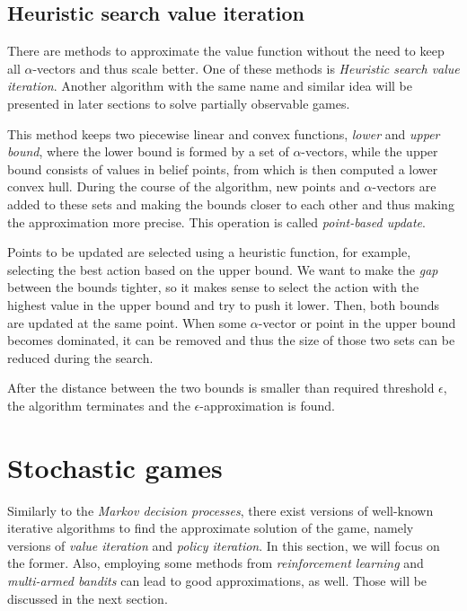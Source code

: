 \documentclass[../main.tex]{subfiles}
\begin{document}
\subsection{Heuristic search value iteration}\label{standard:pomdp:hsvi}
There are methods to approximate the value function without the need to keep all $\alpha$-vectors and thus scale better.
One of these methods is \textit{Heuristic search value iteration}\cite{hsvi}.
Another algorithm with the same name and similar idea will be presented in later sections to solve partially observable games.

This method keeps two piecewise linear and convex functions, \textit{lower} and \textit{upper bound}, where the lower bound is formed by a set of $\alpha$-vectors, while the upper bound consists of values in belief points, from which is then computed a lower convex hull.
During the course of the algorithm, new points and $\alpha$-vectors are added to these sets and making the bounds closer to each other and thus making the approximation more precise.
This operation is called \textit{point-based update}.

Points to be updated are selected using a heuristic function, for example, selecting the best action based on the upper bound.
We want to make the \textit{gap} between the bounds tighter, so it makes sense to select the action with the highest value in the upper bound and try to push it lower.
Then, both bounds are updated at the same point.
When some $\alpha$-vector or point in the upper bound becomes dominated, it can be removed and thus the size of those two sets can be reduced during the search.

After the distance between the two bounds is smaller than required threshold $\epsilon$, the algorithm terminates and the $\epsilon$-approximation is found.

\section{Stochastic games}\label{standard:sg}
Similarly to the \textit{Markov decision processes}, there exist versions of well-known iterative algorithms to find the approximate solution of the game, namely versions of \textit{value iteration} and \textit{policy iteration}.
In this section, we will focus on the former.
Also, employing some methods from \textit{reinforcement learning} and \textit{multi-armed bandits} can lead to good approximations, as well.
Those will be discussed in the next section.
\end{document}
